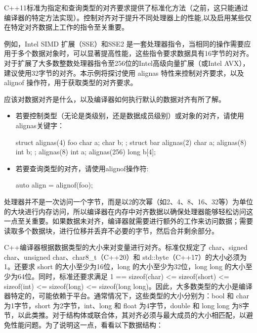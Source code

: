 

C++11标准为指定和查询类型的对齐要求提供了标准化方法（之前，这只能通过编译器的特定方法实现）。控制对齐对于提升不同处理器上的性能,以及启用某些仅在特定对齐数据上工作的指令至关重要。

例如，Intel SIMD 扩展（SSE）和SSE2 是一套处理器指令，当相同的操作需要应用于多个数据对象时，可以显著提高性能，这些指令要求数据具有16字节的对齐。对于扩展了大多数整数处理器指令至256位的Intel高级向量扩展（或Intel AVX），建议使用32字节的对齐。本示例将探讨使用 alignas 特性来控制对齐要求，以及 alignof 操作符，用于获取类型的对齐要求。


应该对数据对齐是什么，以及编译器如何执行默认的数据对齐有所了解。


\begin{itemize}
\item
若要控制类型（无论是类级别，还是数据成员级别）或对象的对齐，请使用alignas关键字：

\begin{cpp}
struct alignas(4) foo
{
    char a;
    char b;
};
struct bar
{
    alignas(2) char a;
    alignas(8) int  b;
};
alignas(8)   int a;
alignas(256) long b[4];
\end{cpp}

\item
若要查询类型的对齐，请使用alignof操作符:

\begin{cpp}
auto align = alignof(foo);
\end{cpp}
\end{itemize}


处理器并不是一次访问一个字节，而是以2的次幂（如2、4、8、16、32等）为单位的大块进行内存访问，所以编译器在内存中对齐数据以确保处理器能够轻松访问这一点至关重要。如果数据未对齐，编译器就需要进行额外的工作来访问数据；需要读取多个数据块，进行位移并丢弃不必要的字节，然后合并剩余部分。

C++编译器根据数据类型的大小来对变量进行对齐。标准仅规定了 char、signed char、unsigned char、char8\_t（C++20）和 std::byte（C++17）的大小必须为1。还要求 short 的大小至少为16位，long 的大小至少为32位，long long 的大小至少为64位。同时，标准还要求满足 1 == sizeof(char) <= sizeof(short) <= sizeof(int) <= sizeof(long) <= sizeof(long long)。因此，大多数类型的大小是编译器特定的，可能依赖于平台。通常情况下，这些类型的大小分别为：bool 和 char 为1字节，short 为2字节，int、long 和 float 为4字节，double 和 long long 为8字节，以此类推。对于结构体或联合体，其对齐必须与最大成员的大小相匹配，以避免性能问题。为了说明这一点，看看以下数据结构：

